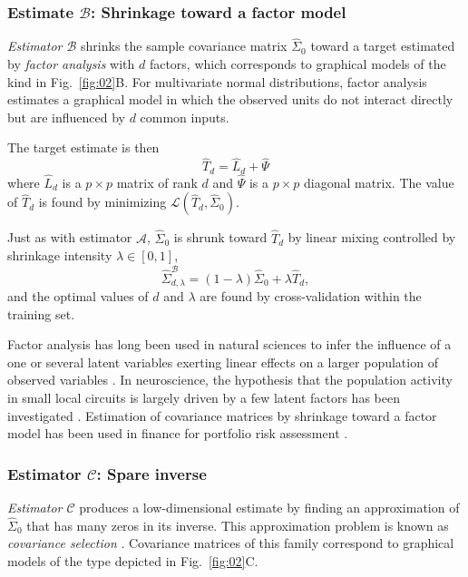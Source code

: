 \documentclass[10pt]{article}
\newcommand{\Kcomment}[1]{{\color{blue}{[KJ: #1]}}}
\newcommand{\loss}[1]{\mathcal L\left(#1\right)}
\begin{document}
\subsubsection*{Estimate $\mathcal B$: Shrinkage toward a factor model}
\emph{Estimator $\mathcal B$} shrinks the sample covariance matrix $\hat\Sigma_0$ toward a target estimated by \emph{factor analysis} with $d$ factors, which corresponds to graphical models of the kind in Fig.~\ref{fig:02}B. For multivariate normal distributions, factor analysis estimates a graphical model in which the observed units do not interact directly but are influenced by $d$ common inputs.

The target estimate is then 
\begin{equation}
\hat T_d = \hat L_d + \hat \Psi
\end{equation}
where $\hat L_d$ is a $p\times p$ matrix of rank $d$ and $\hat \Psi$ is a $p\times p$ diagonal matrix. The value of $\hat T_d$ is found by minimizing $\loss{\hat T_d, \hat\Sigma_0}$. 
\Kcomment{I would give a more explicit representation of $\hat L_d$ as a product to show that the factors can be understood as common input.}

Just as with estimator $\mathcal A$, $\hat\Sigma_0$ is shrunk toward $\hat T_d$ by linear mixing controlled by shrinkage intensity $\lambda\in[0,1]$,
\begin{equation}
\hat\Sigma_{d,\lambda}^\mathcal{B} = (1-\lambda)\hat\Sigma_0 + \lambda\hat T_d,
\end{equation}
and the optimal values of $d$ and $\lambda$ are found by cross-validation within the training set.

Factor analysis has long been used in natural sciences to infer the influence of a one or several latent variables exerting linear effects on a larger population of observed variables \cite{Jvreskog:1996}.  In neuroscience, the hypothesis that the population activity in small local circuits is largely driven by a few latent factors has been investigated \cite{Yu:2009,Ecker:2013}.  Estimation of covariance matrices by shrinkage toward a factor model has been used in finance for portfolio risk assessment \cite{Ledoit:2003,Fan:2008}.

\subsubsection*{Estimator $\mathcal C$: Spare inverse}
\emph{Estimator $\mathcal C$} produces a low-dimensional estimate by finding an approximation of $\hat\Sigma_0$ that has many zeros in its inverse. This approximation problem is known as \emph{covariance selection} \cite{Dempster:1972}.  Covariance matrices of this family correspond to graphical models of the type depicted in Fig.~\ref{fig:02}C.
\end{document}
